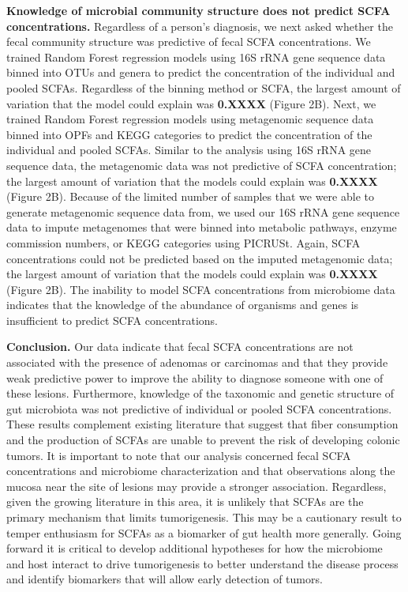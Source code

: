 \documentclass[11pt,]{article}
\begin{document}
\textbf{Knowledge of microbial community structure does not predict SCFA
concentrations.} Regardless of a person's diagnosis, we next asked
whether the fecal community structure was predictive of fecal SCFA
concentrations. We trained Random Forest regression models using 16S
rRNA gene sequence data binned into OTUs and genera to predict the
concentration of the individual and pooled SCFAs. Regardless of the
binning method or SCFA, the largest amount of variation that the model
could explain was \textbf{0.XXXX} (Figure 2B). Next, we trained Random
Forest regression models using metagenomic sequence data binned into
OPFs and KEGG categories to predict the concentration of the individual
and pooled SCFAs. Similar to the analysis using 16S rRNA gene sequence
data, the metagenomic data was not predictive of SCFA concentration; the
largest amount of variation that the models could explain was
\textbf{0.XXXX} (Figure 2B). Because of the limited number of samples
that we were able to generate metagenomic sequence data from, we used
our 16S rRNA gene sequence data to impute metagenomes that were binned
into metabolic pathways, enzyme commission numbers, or KEGG categories
using PICRUSt. Again, SCFA concentrations could not be predicted based
on the imputed metagenomic data; the largest amount of variation that
the models could explain was \textbf{0.XXXX} (Figure 2B). The inability
to model SCFA concentrations from microbiome data indicates that the
knowledge of the abundance of organisms and genes is insufficient to
predict SCFA concentrations.

\textbf{Conclusion.} Our data indicate that fecal SCFA concentrations
are not associated with the presence of adenomas or carcinomas and that
they provide weak predictive power to improve the ability to diagnose
someone with one of these lesions. Furthermore, knowledge of the
taxonomic and genetic structure of gut microbiota was not predictive of
individual or pooled SCFA concentrations. These results complement
existing literature that suggest that fiber consumption and the
production of SCFAs are unable to prevent the risk of developing colonic
tumors. It is important to note that our analysis concerned fecal SCFA
concentrations and microbiome characterization and that observations
along the mucosa near the site of lesions may provide a stronger
association. Regardless, given the growing literature in this area, it
is unlikely that SCFAs are the primary mechanism that limits
tumorigenesis. This may be a cautionary result to temper enthusiasm for
SCFAs as a biomarker of gut health more generally. Going forward it is
critical to develop additional hypotheses for how the microbiome and
host interact to drive tumorigenesis to better understand the disease
process and identify biomarkers that will allow early detection of
tumors.
\end{document}
